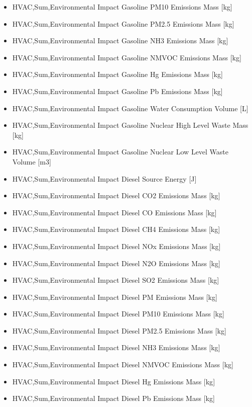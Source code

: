 \begin{itemize}
\item
  HVAC,Sum,Environmental Impact Gasoline PM10 Emissions Mass {[}kg{]}
\item
  HVAC,Sum,Environmental Impact Gasoline PM2.5 Emissions Mass {[}kg{]}
\item
  HVAC,Sum,Environmental Impact Gasoline NH3 Emissions Mass {[}kg{]}
\item
  HVAC,Sum,Environmental Impact Gasoline NMVOC Emissions Mass {[}kg{]}
\item
  HVAC,Sum,Environmental Impact Gasoline Hg Emissions Mass {[}kg{]}
\item
  HVAC,Sum,Environmental Impact Gasoline Pb Emissions Mass {[}kg{]}
\item
  HVAC,Sum,Environmental Impact Gasoline Water Consumption Volume {[}L{]}
\item
  HVAC,Sum,Environmental Impact Gasoline Nuclear High Level Waste Mass {[}kg{]}
\item
  HVAC,Sum,Environmental Impact Gasoline Nuclear Low Level Waste Volume {[}m3{]}
\item
  HVAC,Sum,Environmental Impact Diesel Source Energy {[}J{]}
\item
  HVAC,Sum,Environmental Impact Diesel CO2 Emissions Mass {[}kg{]}
\item
  HVAC,Sum,Environmental Impact Diesel CO Emissions Mass {[}kg{]}
\item
  HVAC,Sum,Environmental Impact Diesel CH4 Emissions Mass {[}kg{]}
\item
  HVAC,Sum,Environmental Impact Diesel NOx Emissions Mass {[}kg{]}
\item
  HVAC,Sum,Environmental Impact Diesel N2O Emissions Mass {[}kg{]}
\item
  HVAC,Sum,Environmental Impact Diesel SO2 Emissions Mass {[}kg{]}
\item
  HVAC,Sum,Environmental Impact Diesel PM Emissions Mass {[}kg{]}
\item
  HVAC,Sum,Environmental Impact Diesel PM10 Emissions Mass {[}kg{]}
\item
  HVAC,Sum,Environmental Impact Diesel PM2.5 Emissions Mass {[}kg{]}
\item
  HVAC,Sum,Environmental Impact Diesel NH3 Emissions Mass {[}kg{]}
\item
  HVAC,Sum,Environmental Impact Diesel NMVOC Emissions Mass {[}kg{]}
\item
  HVAC,Sum,Environmental Impact Diesel Hg Emissions Mass {[}kg{]}
\item
  HVAC,Sum,Environmental Impact Diesel Pb Emissions Mass {[}kg{]}

\end{itemize}
